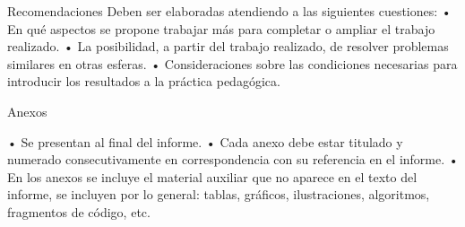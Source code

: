 \begin{recomendations}
    Recomendaciones
    Deben ser elaboradas atendiendo a las siguientes
    cuestiones:
    • En qué aspectos se propone trabajar más para
    completar o ampliar el trabajo realizado.
    • La posibilidad, a partir del trabajo realizado, de
    resolver problemas similares en otras esferas.
    • Consideraciones sobre las condiciones necesarias
    para introducir los resultados a la práctica
    pedagógica.
    
    Anexos
    
    • Se presentan al final del informe.
    • Cada anexo debe estar titulado y numerado 
    consecutivamente en correspondencia con su 
    referencia en el informe. 
    • En los anexos se incluye el material auxiliar que no 
    aparece en el texto del informe, se incluyen por lo 
    general: tablas, gráficos, ilustraciones, algoritmos, 
    fragmentos de código, etc.
\end{recomendations}
